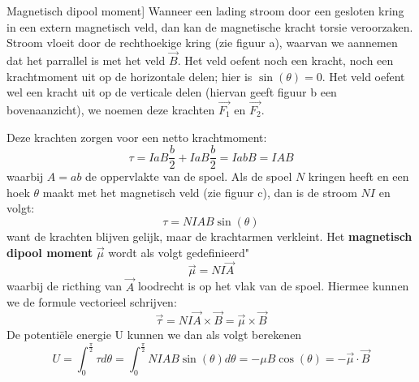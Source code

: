 \begin{theo}{Magnetisch dipool moment]}
    Wanneer een lading stroom door een gesloten kring in een extern magnetisch veld, dan kan de magnetische kracht torsie veroorzaken.
    Stroom vloeit door de rechthoekige kring (zie figuur a), waarvan we aannemen dat het parrallel is met het veld $\Vec{B}$.
    Het veld oefent noch een kracht, noch een krachtmoment uit op de horizontale delen; hier is $\sin(\theta) = 0$. Het veld oefent wel een kracht uit op de verticale delen
    (hiervan geeft figuur b een bovenaanzicht), we noemen deze krachten $\Vec{F_1}$ en $\Vec{F_2}$.


    \vspace{0.1cm}\hspace{-0.5cm}\begin{minipage}{0.76\textwidth}
        Deze krachten zorgen voor een netto krachtmoment:
        \begin{equation*}
            \tau = IaB\dfrac{b}{2} + IaB\dfrac{b}{2} = IabB = IAB
        \end{equation*}
        waarbij $A = ab$ de oppervlakte van de spoel.
        Als de spoel $N$ kringen heeft en een hoek $\theta$ maakt met het magnetisch veld (zie figuur c),
        dan is de stroom $NI$ en volgt:
        \begin{equation*}
            \tau = NIAB\sin(\theta)
        \end{equation*}
        want de krachten blijven gelijk, maar de krachtarmen verkleint.
        Het \textbf{magnetisch dipool moment} $\Vec{\mu}$ wordt als volgt gedefinieerd"
        \begin{equation*}
            \Vec{\mu} = NI\Vec{A}
        \end{equation*}
        waarbij de ricthing van $\Vec{A}$ loodrecht is op het vlak van de spoel. Hiermee kunnen we de formule vectorieel schrijven:
        \begin{equation*}
            \Vec{\tau} = NI\Vec{A} \times \Vec{B} = \Vec{\mu} \times \Vec{B}
        \end{equation*}
        De potentiële energie U kunnen we dan als volgt berekenen
        \begin{equation*}
            U = \int_0^{\tfrac{\pi}{2}} \tau d\theta = \int_0^{\tfrac{\pi}{2}} NIAB\sin(\theta) d\theta = -\mu B\cos(\theta) = -\Vec{\mu} \cdot \Vec{B}
        \end{equation*}
    \end{minipage}

\end{theo}
